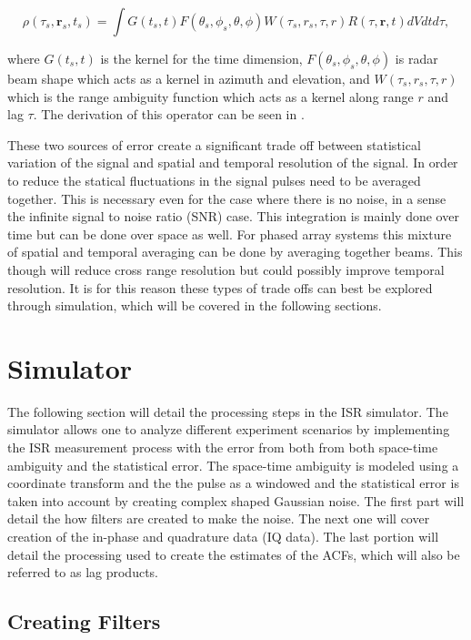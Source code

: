 \documentclass[draft,ras]{agutex}
\begin{document}
\begin{article}
\begin{equation}
\label{eqn:stafbrok}
\rho(\tau_s,\mathbf{r}_s,t_s)= \int G(t_s,t)F(\theta_s,\phi_s,\theta,\phi)W(\tau_s,r_s,\tau,r) R(\tau,\mathbf{r},t) dVdt d\tau,
\end{equation}

\noindent where $G(t_s,t)$ is the kernel for the time dimension, $F(\theta_s,\phi_s,\theta,\phi)$ is radar beam shape which acts as a kernel in azimuth and elevation, and $W(\tau_s,r_s,\tau,r) $ which is the range ambiguity function which acts as a kernel along range $r$ and lag $\tau$. The derivation of this operator can be seen in \citet{RDS:RDS20236}.

These two sources of error create a significant trade off between statistical variation of the signal and spatial and temporal resolution of the signal. In order to reduce the statical fluctuations in the signal pulses need to be averaged together. This is necessary even for the case where there is no noise, in a sense the infinite signal to noise ratio (SNR) case. This integration is mainly done over time but can be done over space as well. For phased array systems this mixture of spatial and temporal averaging can be done by averaging together beams. This though will reduce cross range resolution but could possibly improve temporal resolution. It is for this reason these types of trade offs can best be explored through simulation, which will be covered in the following sections.
\section{Simulator}

The following section will detail the processing steps in the ISR simulator. The simulator allows one to analyze different experiment scenarios by implementing the ISR measurement process with the error from both from both space-time ambiguity and the statistical error. The space-time ambiguity is modeled using a coordinate transform and the the pulse as a windowed and the statistical error is taken into account by creating complex shaped Gaussian noise. The first part will detail the how filters are created to make the noise. The next one will cover creation of the in-phase and quadrature data (IQ data). The last portion will detail the processing used to create the estimates of the ACFs, which will also be referred to as lag products.

\subsection{Creating Filters}


\end{article}
\end{document}
